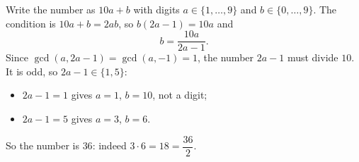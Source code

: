 Write the number as $10a+b$ with digits $a\in\{1,\dots,9\}$ and $b\in\{0,\dots,9\}$. The condition is $10a+b=2ab$, so $b(2a-1)=10a$ and
\[
b=\dfrac{10a}{2a-1}.
\]
Since $\gcd(a,2a-1)=\gcd(a,-1)=1$, the number $2a-1$ must divide $10$. It is odd, so $2a-1\in\{1,5\}$:
\begin{itemize}
\item $2a-1=1$ gives $a=1$, $b=10$, not a digit;
\item $2a-1=5$ gives $a=3$, $b=6$.
\end{itemize}
So the number is $\boxed{36}$: indeed $3\cdot6=18=\dfrac{36}{2}$.
